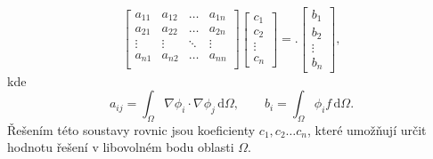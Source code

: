 \documentclass[12pt,a4paper,oneside]{article}
\numberwithin{equation}{section} %
\numberwithin{figure}{section} %
\numberwithin{table}{section} %
\newcommand{\dif}{\,\mathrm{d}} %
\begin{document}
\begin{equation}
\left[\begin{array}{cccc}
a_{11} & a_{12} & \dots &  a_{1n} \\
a_{21} & a_{22} & \dots &  a_{2n} \\
\vdots & \vdots & \ddots & \vdots \\
a_{n1} & a_{n2} & \dots &  a_{nn} \\
\end{array}\right]
\left[\begin{array}{c}
c_1 \\
c_2 \\
\vdots \\
c_n
\end{array}\right] = .
\left[\begin{array}{c}
b_1 \\
b_2 \\
\vdots \\
b_n
\end{array}\right],
\end{equation}
kde
\begin{equation}
a_{ij} = \int_\Omega \nabla \phi_i \cdot \nabla \phi_j \dif \Omega, \qquad b_i =  \int_\Omega \phi_i f \dif \Omega.
\end{equation}
Řešením této soustavy rovnic jsou koeficienty $c_1, c_2 \dots c_n$, které umožňují určit hodnotu řešení v libovolném bodu oblasti $\Omega$.

%
%
\end{document}
